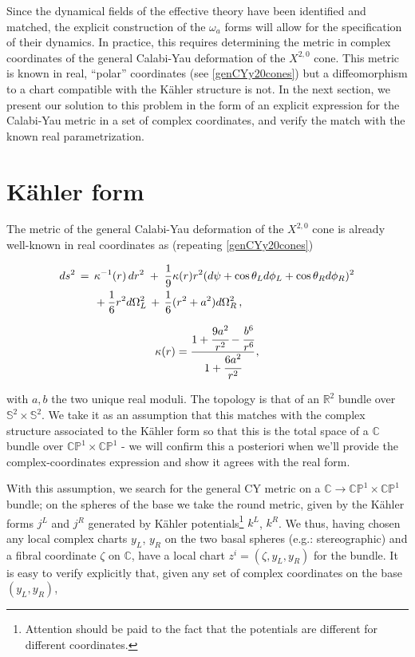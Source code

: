 Since the dynamical fields of the effective theory have been identified and matched, the explicit construction of the $\omega_a$ forms will allow for the specification of their dynamics. In practice, this requires determining the metric in complex coordinates of the general Calabi-Yau deformation of the $X^{2,0}$ cone. This metric is known in real, ``polar'' coordinates (see \eqref{genCYy20cones}) but a diffeomorphism to a chart compatible with the K\"ahler structure is not. In the next section, we present our solution to this problem in the form of an explicit expression for the Calabi-Yau metric in a set of complex coordinates, and verify the match with the known real parametrization.


\section{K\"ahler form}

The metric of the general Calabi-Yau deformation of the $X^{2,0}$ cone is already well-known in real coordinates as (repeating \eqref{genCYy20cones})

\begin{align}
\begin{split}
ds^2 \,= \;\, &\kappa^{-1}(r)\,dr^2 \;+\; \frac{1}{9} \kappa(r) r^2 \large(d\psi + \cos\theta_L d\phi_L + \cos\theta_R d\phi_R\large)^2\\
& + \frac{1}{6} r^2 d\Omega_L^2 \,+ \, \frac{1}{6}(r^2+a^2) d\Omega_R^2\,, \label{y20metric} 
\end{split}
\end{align}

\begin{equation}
	\kappa(r) = \cfrac{1 + \cfrac{9a^2}{r^2} - \cfrac{b^6}{r^6}}{1+ \cfrac{6a^2}{r^2}}\,,
\end{equation}

with $a,b$ the two unique real moduli. The topology is that of an $\mathbb{R}^2$ bundle over $\mathbb{S}^2 \times \mathbb{S}^2$. We take it as an assumption that this matches with the complex structure associated to the K\"ahler form so that this is the total space of a $\mathbb{C}$ bundle over $\mathbb{CP}^1 \times \mathbb{CP}^1$ - we will confirm this a posteriori when we'll provide the complex-coordinates expression and show it agrees with the real form.

With this assumption, we search for the general CY metric on a $\mathbb{C} \rightarrow \mathbb{CP}^1 \times \mathbb{CP}^1$ bundle; on the spheres of the base we take the round metric, given by the K\"ahler forms $j^L$ and $j^R$ generated by K\"ahler potentials\footnote{Attention should be paid to the fact that the potentials are different for different coordinates.} $k^L$, $k^R$. We thus, having chosen any local complex charts $y_L$, $y_R$ on the two basal spheres (e.g.: stereographic) and a fibral coordinate $\zeta$ on $\mathbb{C}$, have a local chart $z^i = (\zeta,y_L,y_R)$ for the bundle. It is easy to verify explicitly that, given any set of complex coordinates on the base $(y_L,y_R)$,

